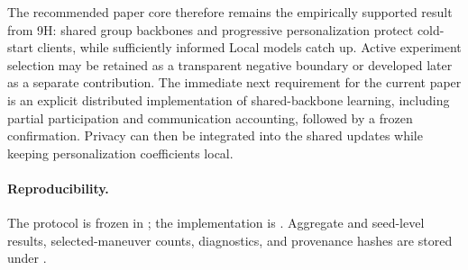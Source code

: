 The recommended paper core therefore remains the empirically supported result
from 9H: shared group backbones and progressive personalization protect cold-
start clients, while sufficiently informed Local models catch up. Active
experiment selection may be retained as a transparent negative boundary or
developed later as a separate contribution. The immediate next requirement for
the current paper is an explicit distributed implementation of shared-backbone
learning, including partial participation and communication accounting, followed
by a frozen confirmation. Privacy can then be integrated into the shared updates
while keeping personalization coefficients local.

\paragraph{Reproducibility.}
The protocol is frozen in ; the implementation
is . Aggregate and
seed-level results, selected-maneuver counts, diagnostics, and provenance hashes
are stored under .
